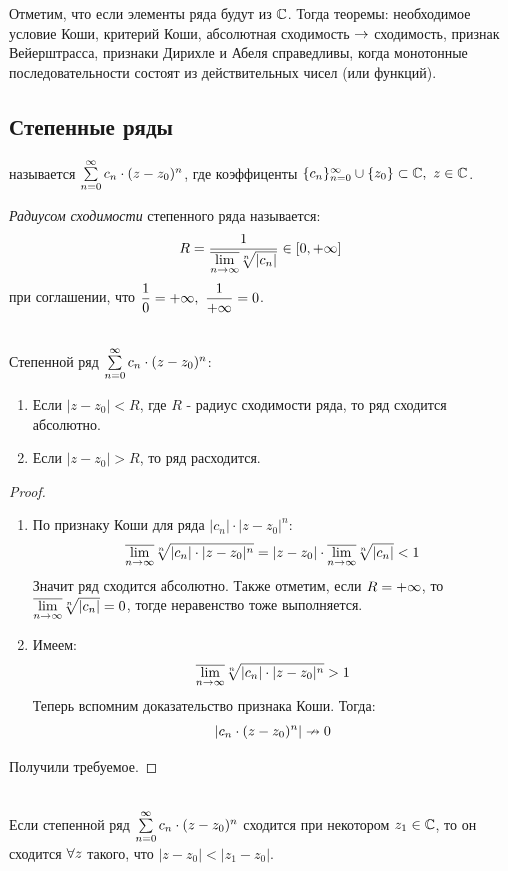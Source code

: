 \begin{note}
	Отметим, что если элементы ряда будут из $\mathbb C$. Тогда теоремы: необходимое условие Коши, критерий Коши, абсолютная сходимость $\rightarrow$ сходимость, признак Вейерштрасса, признаки Дирихле и Абеля справедливы, когда монотонные последовательности состоят из действительных чисел (или функций).
\end{note}
\subsection{Степенные ряды}
\begin{definition}
	 называется $\sssc$, где коэффиценты $\{c_n\}_{n=0}^\i\cup\{z_0\}\subset\C,\ z\in\C$.
\end{definition}
\begin{definition}
	\textit{Радиусом сходимости} степенного ряда называется:
	\[R=\frac1{\v{\lim_{n\ra\i}}\sqrt[n]{|c_n|}}\in[0,+\i]\]
	при соглашении, что $\ds\frac10=+\i,\ \frac1{+\i}=0$.
\end{definition}
\begin{theorem}\label{17_th1}\\
	Степенной ряд $\sssc$:
	\begin{enumerate}
		\item Если $|z-z_0|<R$, где $R$ - радиус сходимости ряда, то ряд сходится абсолютно.
		\item Если $|z-z_0|>R$, то ряд расходится.
	\end{enumerate}
\end{theorem}
\begin{proof}
	\begin{enumerate}
		\item По признаку Коши для ряда $|c_n|\cdot|z-z_0|^n$:
		\[\v{\lim_{n\ra\i}}\sqrt[n]{|c_n|\cdot|z-z_0|^n}=|z-z_0|\cdot\v{\lim_{n\ra\i}}\sqrt[n]{|c_n|}<1\]
		Значит ряд сходится абсолютно. Также отметим, если $R=+\infty$, то $\v{\lim_{n\ra\i}}\sqrt[n]{|c_n|}=0$, тогде неравенство тоже выполняется.
		\item Имеем:
		\[\v{\lim_{n\ra\i}}\sqrt[n]{|c_n|\cdot|z-z_0|^n}>1\]
		Теперь вспомним доказательство признака Коши. Тогда:
		\[|c_n\cdot(z-z_0)^n|\nrightarrow0\]
	\end{enumerate}
	Получили требуемое.
\end{proof}
\begin{corollary}\\
	Если степенной ряд $\sssc$ сходится при некотором $z_1\in\mathbb C$, то он сходится $\forall z$ такого, что $|z-z_0|<|z_1-z_0|$.
\end{corollary}
